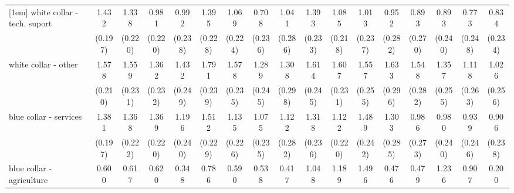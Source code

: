 {\begin{tabular}{l*{16}{c}}
[1em]
white collar - tech. suport&       1.432\sym{***}&       1.338\sym{***}&       0.981\sym{***}&       0.992\sym{***}&       1.395\sym{***}&       1.069\sym{***}&       0.708\sym{**} &       1.041\sym{***}&       1.393\sym{***}&       1.085\sym{***}&       1.013\sym{***}&       0.952\sym{***}&       0.893\sym{***}&       0.893\sym{***}&       0.773\sym{**} &       0.834\sym{***}\\
                    &     (0.197)         &     (0.220)         &     (0.220)         &     (0.238)         &     (0.228)         &     (0.224)         &     (0.236)         &     (0.286)         &     (0.233)         &     (0.218)         &     (0.237)         &     (0.282)         &     (0.270)         &     (0.240)         &     (0.248)         &     (0.234)         \\
[1em]
white collar - other&       1.578\sym{***}&       1.559\sym{***}&       1.362\sym{***}&       1.432\sym{***}&       1.791\sym{***}&       1.578\sym{***}&       1.289\sym{***}&       1.308\sym{***}&       1.614\sym{***}&       1.607\sym{***}&       1.557\sym{***}&       1.633\sym{***}&       1.548\sym{***}&       1.357\sym{***}&       1.118\sym{***}&       1.026\sym{***}\\
                    &     (0.210)         &     (0.231)         &     (0.232)         &     (0.249)         &     (0.239)         &     (0.235)         &     (0.245)         &     (0.298)         &     (0.245)         &     (0.231)         &     (0.255)         &     (0.296)         &     (0.282)         &     (0.255)         &     (0.263)         &     (0.256)         \\
[1em]
blue collar - services&       1.381\sym{***}&       1.368\sym{***}&       1.369\sym{***}&       1.196\sym{***}&       1.512\sym{***}&       1.135\sym{***}&       1.075\sym{***}&       1.122\sym{***}&       1.318\sym{***}&       1.122\sym{***}&       1.489\sym{***}&       1.303\sym{***}&       0.986\sym{***}&       0.980\sym{***}&       0.939\sym{***}&       0.906\sym{***}\\
                    &     (0.197)         &     (0.222)         &     (0.220)         &     (0.240)         &     (0.229)         &     (0.226)         &     (0.235)         &     (0.282)         &     (0.236)         &     (0.220)         &     (0.242)         &     (0.285)         &     (0.273)         &     (0.240)         &     (0.246)         &     (0.238)         \\
[1em]
blue collar - agriculture&       0.600\sym{*}  &       0.617\sym{*}  &       0.620\sym{*}  &       0.348         &       0.786\sym{**} &       0.590\sym{*}  &       0.538         &       0.417         &       1.048\sym{***}&       1.189\sym{**} &       1.496\sym{***}&       0.476         &       0.479         &       1.236\sym{***}&       0.907\sym{**} &       0.200         \\

\end{tabular}}
